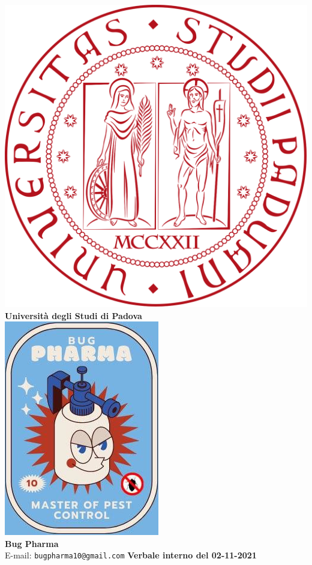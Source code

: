 \documentclass[11pt]{article}
\begin{document}
	\thispagestyle{empty}
	\begin{titlepage}
		\begin{center}
			\includegraphics[scale = 0.05]{logo_unipd.png}\\
			\large \textbf{Università degli Studi di Padova} \\
			\vfill
			\includegraphics[scale = 0.7]{logo_small.jpg}\\
			\large \textbf{Bug Pharma} \\
			\vfill
			\large
			E-mail: 
			\texttt{bugpharma10@gmail.com}
			\vfill
			\Huge \textbf{Verbale interno del 02-11-2021}\\
			

\end{center}
\end{titlepage}
\end{document}

